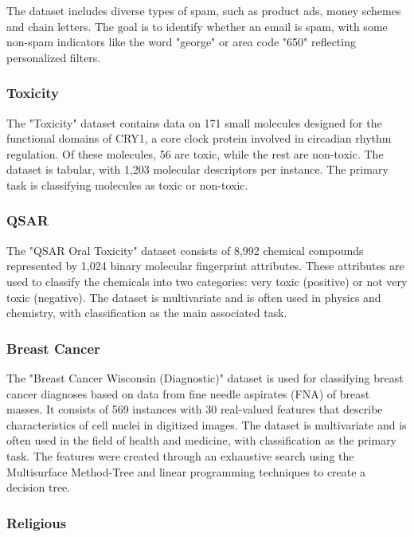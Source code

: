 The dataset includes diverse types of spam, such as product ads, money schemes and chain letters. The goal is to identify whether an email is spam, with some non-spam indicators like the word "george" or area code "650" reflecting personalized filters.

\subsubsection{Toxicity}


The "Toxicity" dataset \citep{gul2021toxicity} contains data on 171 small molecules designed for the functional domains of CRY1, a core clock protein involved in circadian rhythm regulation. Of these molecules, 56 are toxic, while the rest are non-toxic. The dataset is tabular, with 1,203 molecular descriptors per instance. The primary task is classifying molecules as toxic or non-toxic.

\subsubsection{QSAR}

The "QSAR Oral Toxicity" dataset \citep{qsar} consists of 8,992 chemical compounds represented by 1,024 binary molecular fingerprint attributes. These attributes are used to classify the chemicals into two categories: very toxic (positive) or not very toxic (negative). The dataset is multivariate and is often used in physics and chemistry, with classification as the main associated task.


\subsubsection{Breast Cancer}

The "Breast Cancer Wisconsin (Diagnostic)" dataset \citep{street1993breastcancer} is used for classifying breast cancer diagnoses based on data from fine needle aspirates (FNA) of breast masses. It consists of 569 instances with 30 real-valued features that describe characteristics of cell nuclei in digitized images. The dataset is multivariate and is often used in the field of health and medicine, with classification as the primary task. The features were created through an exhaustive search using the Multisurface Method-Tree and linear programming techniques to create a decision tree.


\subsubsection{Religious}

